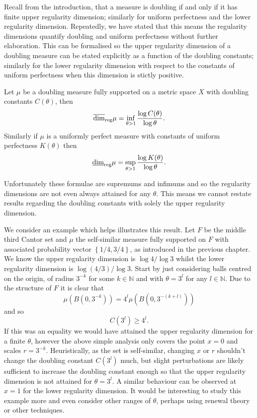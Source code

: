 Recall from the introduction, that a measure is doubling if and only if it has finite upper regularity dimension; similarly for uniform perfectness and the lower regularity dimension. Repeatedly, we have stated that this means the regularity dimensions quantify doubling and uniform perfectness without further elaboration. This can be formalised so the upper regularity dimension of a doubling measure can be stated explicitly as a function of the doubling constants; similarly for the lower regularity dimension with respect to the constants of uniform perfectness when this dimension is stictly positive. 

\begin{theorem}\label{ch-quantifying:equivalence}
Let $\mu$ be a doubling measure fully supported on a metric space $X$ with doubling constants $C(\theta)$, then $$\overline{\dim}_{\textup{reg}} \mu = \inf_{\theta > 1}\frac{\log C(\theta)}{\log \theta}.$$ Similarly if $\mu$ is a uniformly perfect measure with constants of uniform perfectness $K(\theta)$ then $$\underline{\dim}_{\textup{reg}} \mu = \sup_{\theta > 1} \frac{\log K(\theta)}{\log \theta}.$$
\end{theorem}


Unfortunately these formulae are supremums and infimums and so the regularity dimensions are not even always attained for any $\theta$. This means we cannot restate results regarding the doubling constants with solely the upper regularity dimension.

We consider an example which helps illustrates this result. Let $F$ be the middle third Cantor set and $\mu$ the self-similar measure fully supported on $F$ with associated probability vector $\left\{ 1/4, 3/4 \right\}$, as introduced in the previous chapter. We know the upper regularity dimension is $\log 4 / \log 3$ whilst the lower regularity dimension is $\log(4/3) / \log 3$. Start by just considering balls centred on the origin, of radius $3^{-k}$ for some $k \in \mathbb{N}$ and with $\theta = 3^{l}$ for any $l \in \mathbb{N}$. Due to the structure of $F$ it is clear that 
\[
\mu(B(0, 3^{-k})) = 4^{l} \mu(B(0, 3^{-(k+l)}))
\]
and so 
\[
C(3^{l}) \ge 4^l.
\] 
If this was an equality we would have attained the upper regularity dimension for a finite $\theta$, however the above simple analysis only covers the point $x=0$ and scales $r = 3^{-k}$. Heuristically, as the set is self-similar, changing $x$ or $r$ shouldn't change the doubling constant $C(3^{l})$ much, but slight perturbations are likely sufficient to increase the doubling constant enough so that the upper regularity dimension is not attained for $\theta = 3^l$. A similar behaviour can be observed at $x = 1$ for the lower regularity dimension. It would be interesting to study this example more and even consider other ranges of $\theta$, perhaps using renewal theory or other techniques.


